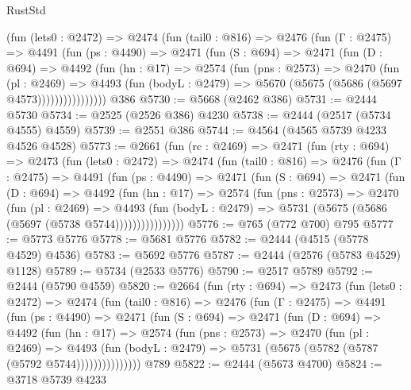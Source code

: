 \begin{lexlean}{RustStd}
\begin{coremodule}
          (fun (lets0 : @2472) =>
          @2474
            (fun (tail0 : @816) =>
            @2476
              (fun (Γ : @2475) =>
              @4491
                (fun (ps : @4490) =>
                @2471
                  (fun (S : @694) =>
                  @2471
                    (fun (D : @694) =>
                    @4492
                      (fun (hn : @17) =>
                      @2574
                        (fun (pns : @2573) =>
                        @2470
                          (fun (pl : @2469) =>
                          @4493
                            (fun (bodyL : @2479) => @5670 (@5675 (@5686 (@5697 @4573))))))))))))))))
    @386
@5730 := @5668 (@2462 @386)
@5731 := @2444 @5730
@5734 := @2525 (@2526 @386) @4230
@5738 := @2444 (@2517 (@5734 @4555) @4559)
@5739 := @2551 @386
@5744 := @4564 (@4565 @5739 @4233 @4526 @4528)
@5773 := @2661
    (fun (rc : @2469) =>
    @2471
      (fun (rty : @694) =>
      @2473
        (fun (lets0 : @2472) =>
        @2474
          (fun (tail0 : @816) =>
          @2476
            (fun (Γ : @2475) =>
            @4491
              (fun (ps : @4490) =>
              @2471
                (fun (S : @694) =>
                @2471
                  (fun (D : @694) =>
                  @4492
                    (fun (hn : @17) =>
                    @2574
                      (fun (pns : @2573) =>
                      @2470
                        (fun (pl : @2469) =>
                        @4493
                          (fun (bodyL : @2479) =>
                          @5731 (@5675 (@5686 (@5697 (@5738 @5744))))))))))))))))
@5776 := @765 (@772 @700) @795
@5777 := @5773 @5776
@5778 := @5681 @5776
@5782 := @2444 (@4515 (@5778 @4529) @4536)
@5783 := @5692 @5776
@5787 := @2444 (@2576 (@5783 @4529) @1128)
@5789 := @5734 (@2533 @5776)
@5790 := @2517 @5789
@5792 := @2444 (@5790 @4559)
@5820 := @2664
    (fun (rty : @694) =>
    @2473
      (fun (lets0 : @2472) =>
      @2474
        (fun (tail0 : @816) =>
        @2476
          (fun (Γ : @2475) =>
          @4491
            (fun (ps : @4490) =>
            @2471
              (fun (S : @694) =>
              @2471
                (fun (D : @694) =>
                @4492
                  (fun (hn : @17) =>
                  @2574
                    (fun (pns : @2573) =>
                    @2470
                      (fun (pl : @2469) =>
                      @4493
                        (fun (bodyL : @2479) =>
                        @5731 (@5675 (@5782 (@5787 (@5792 @5744)))))))))))))))
    @789
@5822 := @2444 (@5673 @4700)
@5824 := @3718 @5739 @4233

\end{coremodule}
\end{lexlean}
